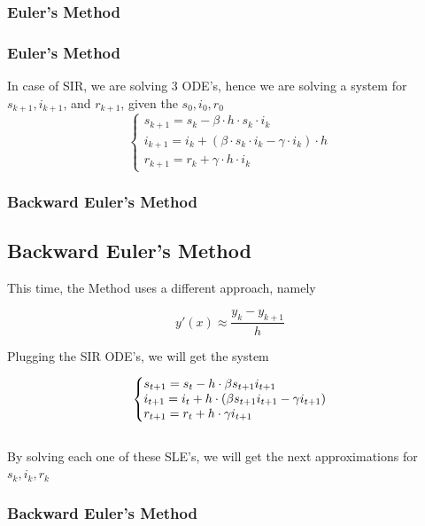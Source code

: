 \documentclass{beamer}
\makeatletter
\newenvironment{system}%
{\left\lbrace\begin{array}{@{}l@{}}}%
{\end{array}\right.}
\makeatother
\begin{document}
\begin{frame}\frametitle{Euler's Method}

\end{frame}

\begin{frame}\frametitle{Euler's Method}
In case of SIR, we are solving 3 ODE's, hence we are solving a system
for $s_{k+1}, i_{k+1}$, and $r_{k+1}$, given the $s_0, i_0, r_0$
\vspace{0.7cm}
\Large
\[
	\left\{
		\begin{array}{l}
			s_{k+1}=s_k - \beta \cdot h \cdot s_k \cdot i_k \\
			i_{k+1}=i_k + (\beta \cdot s_k \cdot i_k - \gamma \cdot i_k) \cdot h \\
			r_{k+1}=r_k+ \gamma \cdot h \cdot i_k
		\end{array}
	\right.
\]
\end{frame}

\begin{frame}\frametitle{Backward Euler's Method}
\subsection{Backward Euler's Method}
This time, the Method uses a different approach, namely

\begin{equation*}
	y'(x) \approx \frac{y_k-y_{k+1}}{h}
\end{equation*}

Plugging the SIR ODE's, we will get the system

    \begin{equation*}
        \begin{system}
        s_{t+1} = s_t - h \cdot \beta s_{t+1} i_{t+1}
        \\
        i_{t+1} = i_t + h \cdot (\beta s_{t+1} i_{t+1} - \gamma i_{t+1})
        \\
        r_{t+1}= r_t + h\cdot \gamma i_{t+1}
        \end{system}
    \end{equation*}
    \vspace{0.3cm}
\\
    By solving each one of these SLE's, we will get the next approximations for $s_k,i_k,r_k$
\end{frame}

\begin{frame}\frametitle{Backward Euler's Method}

\end{frame}
\end{document}

